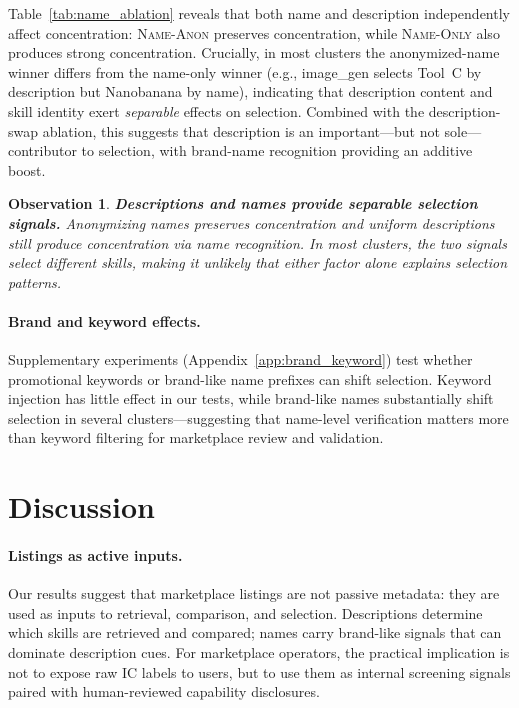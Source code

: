 \documentclass[11pt]{article}
\newtheorem{observation}{Observation}
\begin{document}
Table~\ref{tab:name_ablation} reveals that both name and
description independently affect concentration:
\textsc{Name-Anon} preserves concentration, while
\textsc{Name-Only} also produces strong concentration.
Crucially, in most clusters the anonymized-name winner
differs from the name-only winner (e.g., image\_gen
selects Tool~C by description but Nanobanana by name),
indicating that description content and skill identity
exert \emph{separable} effects on selection.
Combined with the description-swap ablation,
this suggests that description is an important---but
not sole---contributor to selection, with brand-name
recognition providing an additive boost.

\begin{observation}
\textbf{Descriptions and names provide separable
selection signals.}
Anonymizing names preserves concentration
and uniform descriptions still produce concentration
via name recognition.
In most clusters, the two signals select
\emph{different} skills, making it unlikely
that either factor alone explains selection patterns.
\end{observation}

\paragraph{Brand and keyword effects.}
Supplementary experiments
(Appendix~\ref{app:brand_keyword}) test whether
promotional keywords or brand-like name prefixes can
shift selection.
Keyword injection has little effect in our tests,
while brand-like names substantially shift selection
in several clusters---suggesting
that name-level verification matters more than
keyword filtering for marketplace review and validation.

\section{Discussion}
\label{sec:discussion}

\paragraph{Listings as active inputs.}
Our results suggest that marketplace listings are not
passive metadata: they are used as inputs to retrieval,
comparison, and selection.
Descriptions determine which skills are retrieved
and compared; names carry brand-like signals that can
dominate description cues.
For marketplace operators, the practical implication
is not to expose raw IC labels to users, but to use
them as internal screening signals paired with
human-reviewed capability disclosures.
\end{document}
